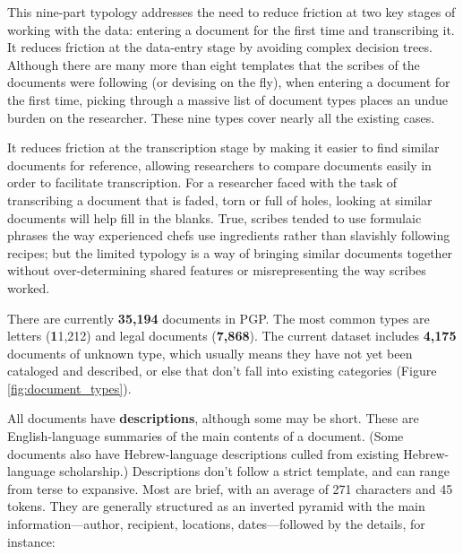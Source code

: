 \documentclass{article}
\def\totalDocuments{35,194}
\def\totalLetter{11,212}
\def\totalLegalDocument{7,868}
\def\totalUnknown{4,175}
\begin{document}
This nine-part typology addresses the need to reduce friction at two key stages of working with the data: entering a document for the first time and transcribing it. It reduces friction at the data-entry stage by avoiding complex decision trees. Although there are many more than eight templates that the scribes of the documents were following (or devising on the fly), when entering a document for the first time, picking through a massive list of document types places an undue burden on the researcher. These nine types cover nearly all the existing cases. 

It reduces friction at the transcription stage by making it easier to find similar documents for reference, allowing researchers to compare documents easily in order to facilitate transcription. For a researcher faced with the task of transcribing a document that is faded, torn or full of holes, looking at similar documents will help fill in the blanks. True, scribes tended to use formulaic phrases the way experienced chefs use ingredients rather than slavishly following recipes; but the limited typology is a way of bringing similar documents together without over-determining shared features or misrepresenting the way scribes worked.

There are currently \textbf{\totalDocuments} documents in PGP. The most common types are letters (\textbf\totalLetter) and legal documents (\textbf{\totalLegalDocument}). The current dataset includes \textbf{\totalUnknown} documents of unknown type, which usually means they have not yet been cataloged and described, or else that don’t fall into existing categories (Figure \ref{fig:document_types}). 

All documents have \textbf{descriptions}, although some may be short. These are English-language summaries of the main contents of a document. (Some documents also have Hebrew-language descriptions culled from existing Hebrew-language scholarship.) Descriptions don’t follow a strict template, and can range from terse to expansive. Most are brief, with an average of 271 characters and 45 tokens. They are generally structured as an inverted pyramid with the main information—author, recipient, locations, dates—followed by the details, for instance: 
\end{document}
